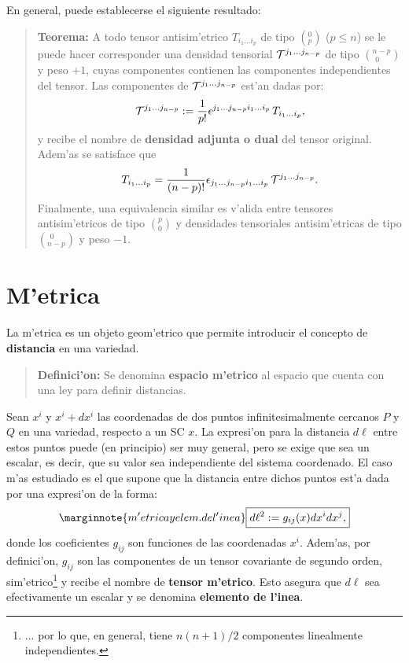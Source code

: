  En general, puede establecerse el siguiente resultado:

 \begin{quotation}
 \textbf{Teorema:} A todo tensor antisim'etrico $T_{i_1\dots i_{p}}
 $ de tipo $(^0_p)$ ($p\leq n$) se le puede hacer corresponder una densidad
 tensorial ${\cal T}^{j_1\dots j_{n-p}}$ de tipo $(_{\ \, 0 }^{n-p})$ y peso
 $+1$, cuyas componentes contienen las componentes independientes del tensor.
 Las componentes de ${\cal T}^{j_1\dots j_{n-p}}$ est'an dadas por:
 \begin{equation}
 {\cal T}^{j_1\dots j_{n-p}}:=\frac{1}{p!}\epsilon^{j_1\dots
 j_{n-p}i_1\dots i_{p}}\,T_{i_1\dots i_{p}}, \label{den16}%
 \end{equation}
 y recibe el nombre de \textbf{densidad adjunta o dual} del tensor original.
 Adem'as se satisface que
 \begin{equation}
 T_{i_1\dots i_{p}}=\frac{1}{(n-p)!}\epsilon_{j_1\dots j_{n-p}i_1\dots
 i_{p}}\,{\cal T}^{j_1\dots j_{n-p}}.
 \end{equation}
 Finalmente, una equivalencia similar es v'alida entre tensores antisim'etricos
 de tipo $(^p_0)$ y densidades tensoriales antisim'etricas de tipo $(^{\ \,
 0}_{n-p})$ y peso $-1$.
 \end{quotation}

\section{M'etrica}

La m'etrica es un objeto geom'etrico que permite introducir el
concepto de \textbf{distancia} en una variedad.

\begin{quotation}
\textbf{Definici'on:} Se denomina \textbf{espacio m'etrico} al
espacio que cuenta con una ley para definir distancias.
\end{quotation}

Sean $x^i $ y $x^i +dx^i $ las coordenadas de dos puntos infinitesimalmente
cercanos $P$ y $Q$ en una variedad, respecto a un SC $x$. La expresi'on para la distancia $d\ell$ entre estos puntos puede (en principio) ser muy general, pero se exige que sea un escalar, es decir, que su valor sea independiente del sistema coordenado. El caso m'as estudiado es el que supone que la distancia entre dichos puntos
est'a dada por una expresi'on de la forma:
\begin{equation}\marginnote{m'etrica y elem. de l'inea}
\boxed{d\ell^2:= g_{ij}(x)dx^i dx^j ,} \label{g1}
\end{equation}
donde los coeficientes $g_{ij}$ son funciones de las coordenadas $x^i$.
Adem'as, por definici'on, $g_{ij}$ son las componentes de un
tensor covariante de segundo orden, sim'etrico\footnote{... por lo que, en general, tiene $n(n+1)/2$ componentes linealmente independientes.} y recibe el nombre de
\textbf{tensor m'etrico}. Esto asegura que $d\ell$ sea efectivamente un
escalar y se denomina \textbf{elemento de l'inea}.

